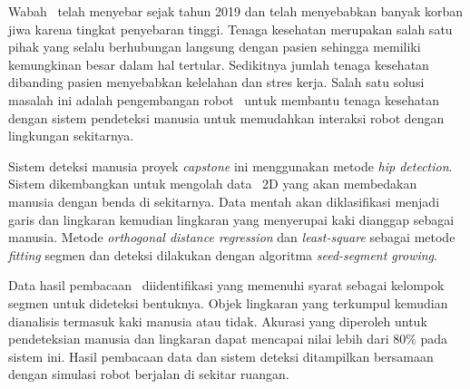 Wabah \covid\ telah menyebar sejak tahun 2019 dan telah menyebabkan banyak korban jiwa karena tingkat penyebaran tinggi. Tenaga kesehatan merupakan salah satu pihak yang selalu berhubungan langsung dengan pasien sehingga memiliki kemungkinan besar dalam hal tertular. Sedikitnya jumlah tenaga kesehatan dibanding pasien menyebabkan kelelahan dan stres kerja. Salah satu solusi masalah ini adalah pengembangan robot \covid\ untuk membantu tenaga kesehatan dengan sistem pendeteksi manusia untuk memudahkan interaksi robot dengan lingkungan sekitarnya. 

Sistem deteksi manusia proyek \textit{capstone} ini menggunakan metode \textit{hip detection}.
Sistem dikembangkan untuk mengolah data \lidar\ 2D yang akan membedakan manusia dengan benda di sekitarnya. Data mentah akan diklasifikasi menjadi garis dan lingkaran kemudian lingkaran yang menyerupai kaki dianggap sebagai manusia. Metode \textit{orthogonal distance regression} dan \textit{least-square} sebagai metode \textit{fitting} segmen dan deteksi dilakukan dengan algoritma \textit{seed-segment growing}. 

Data hasil pembacaan \lidar\ diidentifikasi yang memenuhi syarat sebagai kelompok segmen untuk dideteksi bentuknya. Objek lingkaran yang terkumpul kemudian dianalisis termasuk kaki manusia atau tidak. Akurasi yang diperoleh untuk pendeteksian manusia dan lingkaran dapat mencapai nilai lebih dari $80\%$ pada sistem ini. Hasil pembacaan data dan sistem deteksi ditampilkan bersamaan dengan simulasi robot berjalan di sekitar ruangan.

